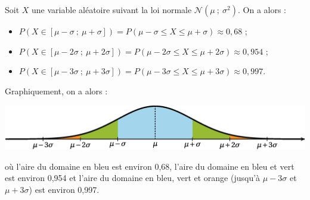 \documentclass{cornouaille}
\begin{document}
\begin{propriete}
Soit $X$ une variable aléatoire suivant la loi normale $\mathcal{N}(\mu\ ;\ \sigma^2)$. On a alors  :

\begin{itemize}
\item $P(X\in[\mu-\sigma\ ;\ \mu+\sigma])=P(\mu-\sigma\leqslant X\leqslant \mu+\sigma)\approx0,68$ ;
\item $P(X\in[\mu-2\sigma\ ;\ \mu+2\sigma])=P(\mu-2\sigma\leqslant X\leqslant \mu+2\sigma)\approx0,954$ ;
\item $P(X\in[\mu-3\sigma\ ;\ \mu+3\sigma])=P(\mu-3\sigma\leqslant X\leqslant \mu+3\sigma)\approx0,997$.
\end{itemize}


Graphiquement, on a alors :




\includegraphics{./TS-Variables-15}




où l'aire du domaine en bleu est environ 0,68, l'aire du domaine en bleu et vert est environ 0,954 et l'aire du domaine en bleu, vert et orange (jusqu'à $\mu-3\sigma$ et $\mu+3\sigma$) est environ 0,997.
\end{propriete}




~~
\end{document}
